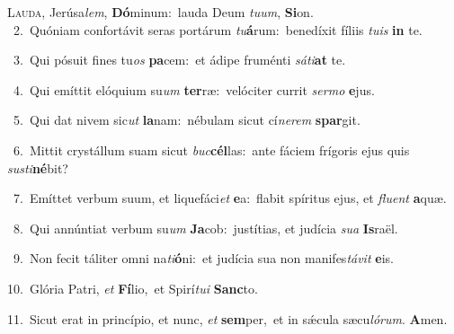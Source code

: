 \lettrine{\initial\textcolor{\initialcolor}{L}}{auda,} Jerúsa\-\textit{lem}\-, \textbf{Dó}\-minum:~\star lauda Deum \textit{tu}\-\textit{um}, \textbf{Si}\-on.\\
{\numbfont\textcolor{\numbcolor}{~2.}}~Quóniam confortávit seras portárum \textit{tu}\-\textbf{á}rum:~\star benedíxit fíliis \textit{tu}\-\textit{is} \textbf{in} te.\par
{\numbfont\textcolor{\numbcolor}{~3.}}~Qui pósuit fines tu\textit{os} \textbf{pa}\-cem:~\star et ádipe fruménti \textit{sá}\-\textit{ti}\textbf{at} te.\par
{\numbfont\textcolor{\numbcolor}{~4.}}~Qui emíttit elóquium su\textit{um} \textbf{ter}\-ræ:~\star velóciter currit \textit{ser}\-\textit{mo} \textbf{e}\-jus.\par
{\numbfont\textcolor{\numbcolor}{~5.}}~Qui dat nivem sic\textit{ut} \textbf{la}\-nam:~\star nébulam sicut cí\-\textit{ne}\-\textit{rem} \textbf{spar}\-git.\par
{\numbfont\textcolor{\numbcolor}{~6.}}~Mittit crystállum suam sicut \textit{buc}\-\textbf{cél}las:~\star ante fáciem frígoris ejus quis \textit{sus}\-\textit{ti}\textbf{né}bit?\par
{\numbfont\textcolor{\numbcolor}{~7.}}~Emíttet verbum suum, et liquefáci\textit{et} \textbf{e}\-a:~\star flabit spíritus ejus, et \textit{flu}\-\textit{ent} \textbf{a}\-quæ.\par
{\numbfont\textcolor{\numbcolor}{~8.}}~Qui annúntiat verbum su\textit{um} \textbf{Ja}\-cob:~\star justítias, et judícia \textit{su}\-\textit{a} \textbf{Is}\-raël.\par
{\numbfont\textcolor{\numbcolor}{~9.}}~Non fecit táliter omni na\-\textit{ti}\-\textbf{ó}ni:~\star et judícia sua non manifes\-\textit{tá}\-\textit{vit} \textbf{e}\-is.\par
{\numbfont\textcolor{\numbcolor}{10.}}~Glória Patri, \textit{et} \textbf{Fí}\-lio,~\star et Spirí\-\textit{tu}\-\textit{i} \textbf{Sanc}\-to.\par
{\numbfont\textcolor{\numbcolor}{11.}}~Sicut erat in princípio, et nunc, \textit{et} \textbf{sem}\-per,~\star et in sǽcula sæcu\-\textit{ló}\-\textit{rum}. \textbf{A}\-men.\par
